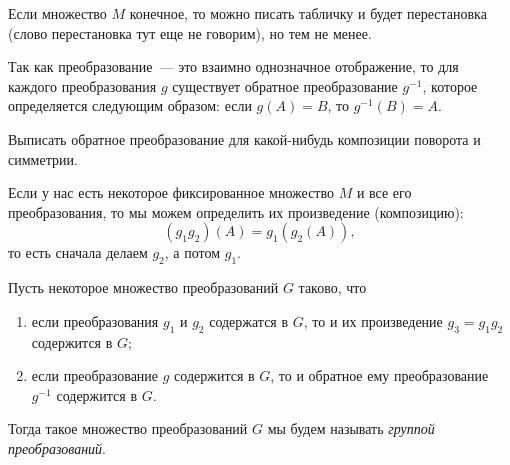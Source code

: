 	\begin{example}
		Если множество $M$ конечное, то можно писать табличку и будет перестановка (слово перестановка тут еще не говорим), но тем не менее. 
	\end{example}

	\begin{definition} 
		Так как преобразование~--- это взаимно однозначное отображение, то для каждого преобразования $g$ существует обратное преобразование $g^{-1}$, которое определяется следующим образом: если $g(A) = B$, то $g^{-1}(B) = A$.
	\end{definition}

	\begin{example}
		Выписать обратное преобразование для какой-нибудь композиции поворота и симметрии. 
	\end{example}

	Если у нас есть некоторое фиксированное множество $M$ и все его преобразования, то мы можем определить их произведение (композицию): 
	\[
		(g_1 g_2)(A) = g_1(g_2(A)),
	\]
	то есть сначала делаем $g_2$, а потом $g_1$. 

	\begin{definition} 
		Пусть некоторое множество преобразований $G$ таково, что 
		\begin{enumerate}
		 	\item если преобразования $g_1$ и $g_2$ содержатся в $G$, то и их произведение $g_3 = g_1g_2$ содержится в $G$;
		 	\item если преобразование $g$ содержится в $G$, то и обратное ему преобразование $g^{-1}$ содержится в $G$.
		 \end{enumerate}
		 Тогда такое множество преобразований $G$ мы будем называть \emph{группой преобразований}.
	\end{definition}
	

	